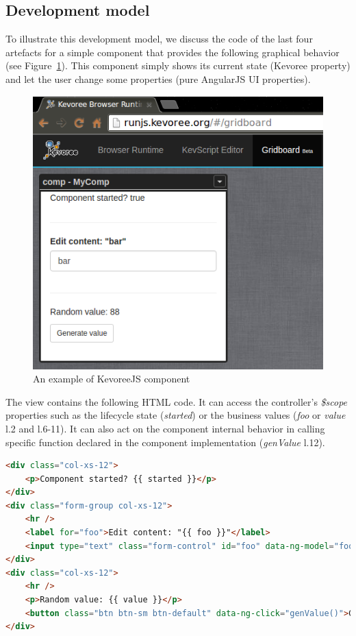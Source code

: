 \subsection{Development model}
To illustrate this development model, we discuss the code of the last four artefacts for a simple component that provides the following graphical behavior (see Figure~\ref{fig:fig5}). This component simply shows its current state (Kevoree property) and let the user change some properties (pure AngularJS UI properties).


\begin{figure}[h]
	\centering
	\includegraphics[width=0.8\linewidth]{figures/fig5}
	\caption{An example of KevoreeJS component}
	\label{fig:fig5}
\end{figure}

The view contains the following HTML code. It can access the controller's \emph{\$scope} properties such as the lifecycle state (\emph{started}) or the business values (\emph{foo} or \emph{value} l.2 and l.6-11). It can also act on the component internal behavior in calling specific function declared in the component implementation (\emph{genValue} l.12).

\begin{lstlisting}[language=HTML,numbers=right,firstnumber=last,frame=none,caption={Excerpt of the component view}]
<div class="col-xs-12">
	<p>Component started? {{ started }}</p>
</div>
<div class="form-group col-xs-12">
	<hr />
	<label for="foo">Edit content: "{{ foo }}"</label>
	<input type="text" class="form-control" id="foo" data-ng-model="foo">
</div>
<div class="col-xs-12">
	<hr />
	<p>Random value: {{ value }}</p>
	<button class="btn btn-sm btn-default" data-ng-click="genValue()">Generate value</button>
</div>
\end{lstlisting}


